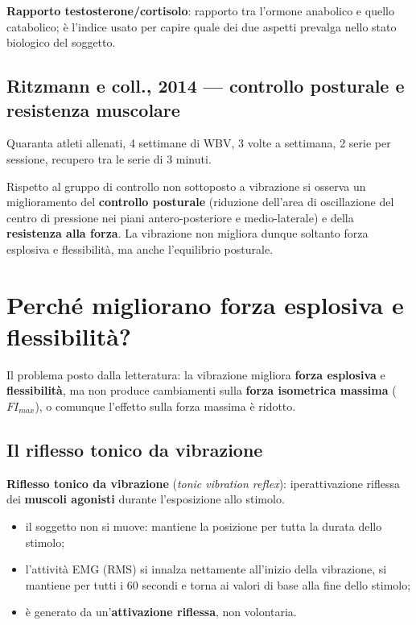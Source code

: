 \textbf{Rapporto testosterone/cortisolo}: rapporto tra l'ormone anabolico e quello catabolico; è
l'indice usato per capire quale dei due aspetti prevalga nello stato biologico del soggetto.

\subsection{Ritzmann e coll., 2014 --- controllo posturale e resistenza muscolare}

Quaranta atleti allenati, 4 settimane di WBV, 3 volte a settimana, 2 serie per sessione, recupero
tra le serie di 3 minuti.

Rispetto al gruppo di controllo non sottoposto a vibrazione si osserva un miglioramento del
\textbf{controllo posturale} (riduzione dell'area di oscillazione del centro di pressione nei piani
antero-posteriore e medio-laterale) e della \textbf{resistenza alla forza}. La vibrazione non
migliora dunque soltanto forza esplosiva e flessibilità, ma anche l'equilibrio posturale.

\section{Perché migliorano forza esplosiva e flessibilità?}
\label{sec:perche}

Il problema posto dalla letteratura: la vibrazione migliora \textbf{forza esplosiva} e
\textbf{flessibilità}, ma non produce cambiamenti sulla \textbf{forza isometrica massima}
($FI_{max}$), o comunque l'effetto sulla forza massima è ridotto.

\subsection{Il riflesso tonico da vibrazione}

\textbf{Riflesso tonico da vibrazione} (\textit{tonic vibration reflex}): iperattivazione riflessa
dei \textbf{muscoli agonisti} durante l'esposizione allo stimolo.
\begin{itemize}
  \item il soggetto non si muove: mantiene la posizione per tutta la durata dello stimolo;
  \item l'attività EMG (RMS) si innalza nettamente all'inizio della vibrazione, si mantiene per
    tutti i 60 secondi e torna ai valori di base alla fine dello stimolo;
  \item è generato da un'\textbf{attivazione riflessa}, non volontaria.
\end{itemize}

